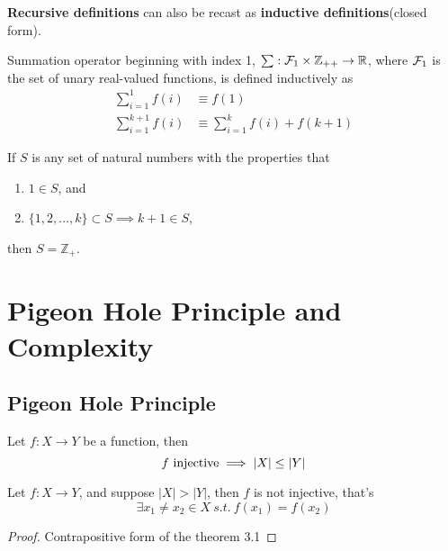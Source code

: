 \documentclass{article}
\def\Z{{\mathbb Z}}
\def\R{{\mathbb R}}
\begin{document}
		\begin{proposition}
			\textbf{Recursive definitions} can also be recast as \textbf{inductive definitions}(closed form).
		\end{proposition}
		
		\begin{definition}[Summation]
			Summation operator beginning with index 1, $\sum: \mc{F}_1 \times \Z_{++} \to \R$, where $\mathcal{{F}}_1$ is the set of unary real-valued functions, is defined inductively as
			\begin{align}
				\sum_{i=1}^1 f(i) &\equiv f(1) \\
				\sum_{i=1}^{k+1} f(i) &\equiv \sum_{i=1}^k f(i) + f(k+1)
			\end{align}
		\end{definition}
		
		
		\begin{theorem}
			If $S$ is any set of natural numbers with the properties that
			\begin{enumerate}
				\item $1 \in S$, and
				\item $\{1, 2, \dots, k\} \subset S \implies k+1 \in S$,
			\end{enumerate}
			then $S = \Z_+$.
		\end{theorem}
	
	\section{Pigeon Hole Principle and Complexity}
		\subsection{Pigeon Hole Principle}
			\begin{theorem}
				Let $f: X \to Y$ be a function, then 
				\begin{equation}
					f \text{{ injective}} \implies |X| \leq |Y|
				\end{equation}
			\end{theorem}
			
			\begin{theorem}
				Let $f: X \to Y$, and suppose $|X| > |Y|$, then $f$ is not injective, that's
				\begin{equation}
					\exists x_1 \neq x_2 \in X\ s.t.\ f(x_1) = f(x_2)
				\end{equation}
				\begin{proof}
					Contrapositive form of the theorem 3.1
				\end{proof}
			\end{theorem}
			
\end{document}
